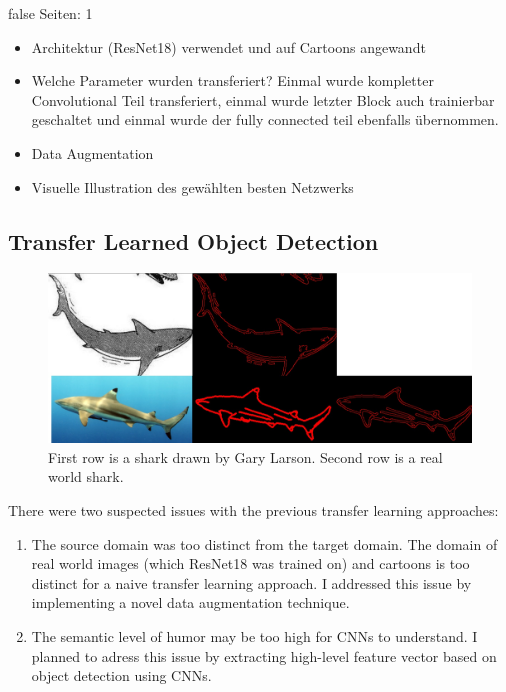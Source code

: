 \documentclass[draft,final,oneside]{vutinfth} %
\begin{document}

\if false
Seiten: 1

\begin{itemize}
\item Architektur (ResNet18) verwendet und auf Cartoons angewandt
\item Welche Parameter wurden transferiert? Einmal wurde kompletter Convolutional Teil transferiert, einmal wurde letzter Block auch trainierbar geschaltet und einmal wurde der fully connected teil ebenfalls übernommen.
\item Data Augmentation
\item Visuelle Illustration des gewählten besten Netzwerks

\end{itemize}
\fi


\subsection{Transfer Learned Object Detection}

\begin{figure}[ht]
	\centering
  	\includegraphics[width=1.0\textwidth]{graphics/edge_edge_detection.jpg}
	\caption{First row is a shark drawn by Gary Larson. Second row is a real world shark.}
	\label{fig:dataugmentation}
\end{figure}

There were two suspected issues with the previous transfer learning approaches:

\begin{enumerate}
\item The source domain was too distinct from the target domain. The domain of real world images (which ResNet18 was trained on) and cartoons is too distinct for a naive transfer learning approach. I addressed this issue by implementing a novel data augmentation technique.
\item The semantic level of humor may be too high for CNNs to understand. I planned to adress this issue by extracting high-level feature vector based on object detection using CNNs.
\end{enumerate}
\end{document}
